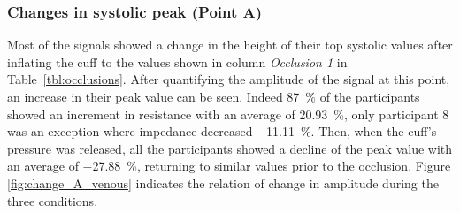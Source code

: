 \subsubsection{Changes in systolic peak (Point A)}
\label{section apa 3.1.1}
Most of the signals showed a change in the height of their top systolic values after inflating the cuff to the values shown in column \textit{Occlusion 1} in Table~\ref{tbl:occlusions}. After quantifying the amplitude of the signal at this point, an increase in their peak value can be seen. Indeed \SI{87}{\percent} of the participants showed an increment in resistance with an average of \SI{20.93}{\percent}, only participant 8 was an exception where impedance decreased \SI{-11.11}{\percent}. Then, when the cuff's pressure was released, all the participants showed a decline of the peak value with an average of \SI{-27.88}{\percent}, returning to similar values prior to the occlusion. Figure \ref{fig:change_A_venous} indicates the relation of change in amplitude during the three conditions. 


